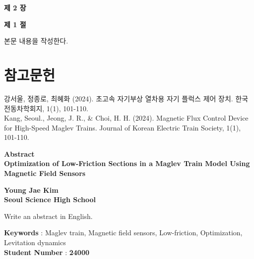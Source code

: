 \documentclass[11pt]{article}
\begin{document}
\begin{center}
  {\LARGE \bf 제 2 장}\\[12pt]
\end{center}

\begin{flushleft}  
{\Large \bf 제 1 절}\\[12pt]
\end{flushleft} 

\begin{flushleft}
본문 내용을 작성한다.
\end{flushleft}

\newpage

\section*{참고문헌}

\begin{flushleft}
강서울, 정종로, 최혜화 (2024). 초고속 자기부상 열차용 자기 플럭스 제어 장치. 한국전동차학회지, 1(1), 101-110. \\
Kang, Seoul., Jeong, J. R., \& Choi, H. H. (2024). Magnetic Flux Control Device for High-Speed Maglev Trains. Journal of Korean Electric Train Society, 1(1), 101-110.
\end{flushleft}

\newpage

\thispagestyle{empty}
\vspace*{0.1cm}

\begin{center}
{\huge \bf Abstract}\\[12pt]
{\huge \bf Optimization of Low-Friction Sections in a Maglev Train Model Using Magnetic Field Sensors}\\[12pt]
\end{center}

\vspace{1.0cm}

\begin{flushright}
{\Large \bf Young Jae Kim}\\[12pt]
{\Large \bf Seoul Science High School}
\end{flushright}

\vspace{1.5cm}

\begin{flushleft}
Write an abstract in English.

\vspace{1.2cm}

\textbf{Keywords} : Maglev train, Magnetic field sensors, Low-friction, Optimization, Levitation dynamics\\
\textbf{Student Number} : \textbf{24000}
\end{flushleft}

\end{document}
